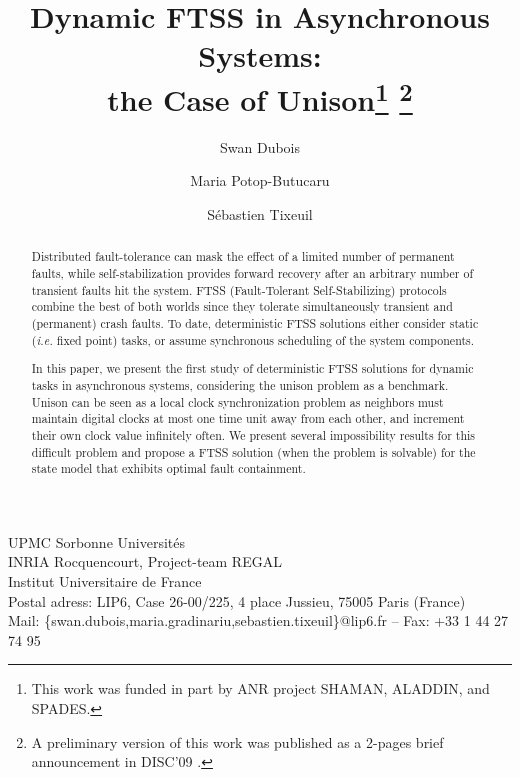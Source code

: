 \documentclass[11pt,english,letterpaper]{article}
\date{}
\begin{document}
\title{Dynamic FTSS in Asynchronous Systems: \\the Case of Unison\protect\footnote{This work was funded in part by ANR project SHAMAN, ALADDIN, and SPADES.} \footnote{A preliminary version of this work was published as a 2-pages brief announcement in DISC'09 \cite{DPT09ca}.}}

\author{
Swan Dubois \and Maria Potop-Butucaru \and S\'ebastien Tixeuil}

\maketitle

\vspace{-0.75cm}

\begin{center}
\scriptsize{
  UPMC Sorbonne Universit\'es\\
  INRIA Rocquencourt, Project-team REGAL\\
  Institut Universitaire de France\\
 Postal adress: LIP6, Case 26-00/225, 4 place Jussieu, 75005 Paris (France)\\
 Mail: \{swan.dubois,maria.gradinariu,sebastien.tixeuil\}@lip6.fr -- Fax: +33 1 44 27 74 95 
}
\end{center}

\begin{abstract}
Distributed fault-tolerance can mask the effect of a limited number of permanent faults, while self-stabilization provides forward recovery after an arbitrary number of transient faults hit the system. FTSS (Fault-Tolerant Self-Stabilizing) protocols combine the best of both worlds since they tolerate simultaneously transient and (permanent) crash faults. To date, deterministic FTSS solutions either consider static (\emph{i.e.} fixed point) tasks, or assume synchronous scheduling of the system components. 

In this paper, we present the first study of deterministic FTSS solutions for dynamic tasks in asynchronous systems, considering the unison problem as a benchmark. Unison can be seen as a local clock synchronization problem as neighbors must maintain digital clocks at most one time unit away from each other, and increment their own clock value infinitely often. We present several impossibility results for this difficult problem and propose a FTSS solution (when the problem is solvable) for the state model that exhibits optimal fault containment.
\end{abstract}
\end{document}
